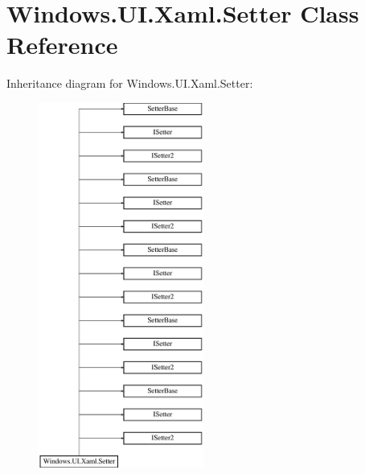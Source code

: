 \hypertarget{class_windows_1_1_u_i_1_1_xaml_1_1_setter}{}\section{Windows.\+U\+I.\+Xaml.\+Setter Class Reference}
\label{class_windows_1_1_u_i_1_1_xaml_1_1_setter}
Inheritance diagram for Windows.\+U\+I.\+Xaml.\+Setter\+:\begin{figure}[H]
\begin{center}
\leavevmode
\includegraphics[height=12.000000cm]{class_windows_1_1_u_i_1_1_xaml_1_1_setter}
\end{center}
\end{figure}
